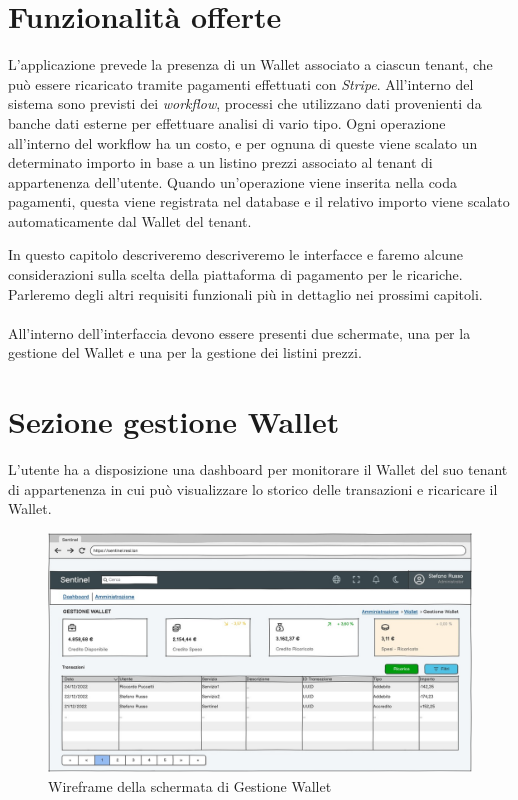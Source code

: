 \section{Funzionalit\`a offerte}
L'applicazione prevede la presenza di un Wallet associato a ciascun tenant, che pu\`o essere ricaricato tramite pagamenti effettuati con \textit{Stripe}.
All'interno del sistema sono previsti dei \textit{workflow}, processi che utilizzano dati provenienti da banche dati esterne per effettuare analisi di vario tipo.
Ogni operazione all'interno del workflow ha un costo, e per ognuna di queste viene scalato un determinato importo in base a un listino prezzi associato al tenant di appartenenza dell'utente.
Quando un'operazione viene inserita nella coda pagamenti, questa viene registrata nel database e il relativo importo viene scalato automaticamente dal Wallet del tenant.

In questo capitolo descriveremo descriveremo le interfacce e faremo alcune considerazioni sulla scelta della piattaforma di pagamento per le ricariche.
Parleremo degli altri requisiti funzionali pi\`u in dettaglio nei prossimi capitoli.\\\\
All'interno dell'interfaccia devono essere presenti due schermate, una per la gestione del Wallet e una per la gestione dei listini prezzi.

\section{Sezione gestione Wallet}
L'utente ha a disposizione una dashboard per monitorare il Wallet del suo tenant di appartenenza in cui pu\`o visualizzare lo storico delle transazioni e ricaricare il Wallet.

\begin{figure}[H]
  \centering
  \includegraphics[width=14cm]{images/gestione-wallet/mock-gestione-wallet.png}
  \caption{Wireframe della schermata di Gestione Wallet}
\end{figure}

